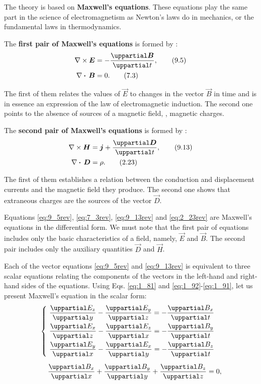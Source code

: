 The theory is based on \textbf{Maxwell's equations}.
These equations play the same part in the science of electromagnetism as Newton's laws do in mechanics, or the fundamental laws in thermodynamics.

The \textbf{first pair of Maxwell's equations} is formed by :
\begin{align}
    \curlop{\vec{E}} &= - \diffpartial{\vec{B}}{t},\label{eq:9_5rev} \tag{9.5}\\
    \divop{\vec{B}} &= 0.\label{eq:7_3rev} \tag{7.3}
\end{align}

\noindent
The first of them relates the values of $\vec{E}$ to changes in the vector $\vec{B}$ in time and is in essence an expression of the law of electromagnetic
induction.
The second one points to the absence of sources of a magnetic field, \ie, magnetic charges.

The \textbf{second pair of Maxwell's equations} is formed by :
\begin{align*}
    \curlop{\vec{H}} &= \vec{j} + \diffpartial{\vec{D}}{t},\label{eq:9_13rev} \tag{9.13}\\
    \divop{\vec{D}} &= \rho.\label{eq:2_23rev} \tag{2.23}
\end{align*}

\noindent
The first of them establishes a relation between the conduction and displacement currents and the magnetic field they produce.
The second one shows that extraneous charges are the sources of the vector $\vec{D}$.

Equations \eqref{eq:9_5rev}, \eqref{eq:7_3rev}, \eqref{eq:9_13rev} and \eqref{eq:2_23rev} are Maxwell's equations in the differential form.
We must note that the first pair of equations includes only the basic characteristics of a field, namely, $\vec{E}$ and $\vec{B}$.
The second pair includes only the auxiliary quantities $\vec{D}$ and $\vec{H}$.

Each of the vector equations \eqref{eq:9_5rev} and \eqref{eq:9_13rev} is equivalent to three scalar equations relating the components of the vectors in the left-hand and right-hand sides of the equations.
Using Eqs. \eqref{eq:1_81} and \eqref{eq:1_92}-\eqref{eq:1_91}, let us present Maxwell's equation in the scalar form:
\begin{align}
    & \begin{cases}
        &\!\!\!\! \diffpartial{E_z}{y} - \diffpartial{E_y}{z} = - \diffpartial{B_x}{t}\\[8pt]
        &\!\!\!\! \diffpartial{E_x}{z} - \diffpartial{E_z}{x} = - \diffpartial{B_y}{t}\\[8pt]
        &\!\!\!\! \diffpartial{E_y}{x} - \diffpartial{E_x}{y} = - \diffpartial{B_z}{t}\\
    \end{cases}\label{eq:9_15}\\[5pt]
    & \quad\,\diffpartial{B_x}{x} + \diffpartial{B_y}{y} + \diffpartial{B_z}{z} = 0,\label{eq:9_16}
\end{align}

